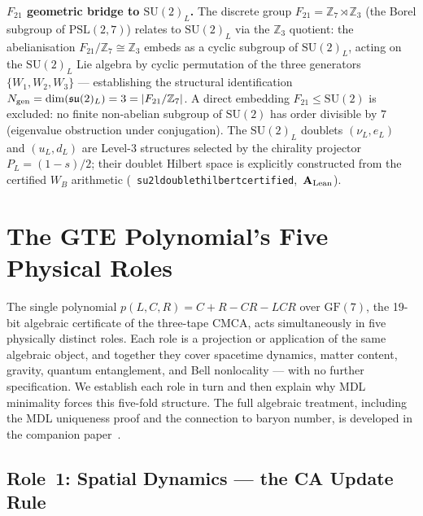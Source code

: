 \documentclass[11pt]{article}
\theoremstyle{remark}
\newcommand{\lean}[1]{%
  \penalty-100
  \begingroup\def\_{\textunderscore\allowbreak}\texttt{#1}\endgroup}
\newcommand{\CatAL}{\ensuremath{\textbf{A}_{\rm Lean}}}
\newcommand{\CMCA}{\text{CMCA}}
\newcommand{\poly}{p(L,C,R)}
\newcommand{\polyform}{C+R-CR-LCR}
\newcommand{\FF}{\mathrm{GF}}
\begin{document}
\smallskip\noindent\textbf{$F_{21}$ geometric bridge to $\mathrm{SU}(2)_L$.}\enspace
The discrete group $F_{21} = \mathbb{Z}_7 \rtimes \mathbb{Z}_3$ (the Borel subgroup of
$\mathrm{PSL}(2,7)$) relates to $\mathrm{SU}(2)_L$ via the $\mathbb{Z}_3$ quotient:
the abelianisation $F_{21}/\mathbb{Z}_7 \cong \mathbb{Z}_3$ embeds as a cyclic
subgroup of $\mathrm{SU}(2)_L$, acting on the $\mathrm{SU}(2)_L$ Lie algebra by
cyclic permutation of the three generators $\{W_1, W_2, W_3\}$ — establishing the
structural identification $N_{\rm gen} = \dim(\mathfrak{su}(2)_L) = 3 = |F_{21}/\mathbb{Z}_7|$.
A direct embedding $F_{21} \leq \mathrm{SU}(2)$ is excluded: no finite non-abelian
subgroup of $\mathrm{SU}(2)$ has order divisible by $7$ (eigenvalue obstruction under
conjugation).  The $\mathrm{SU}(2)_L$ doublets $(\nu_L, e_L)$ and $(u_L, d_L)$ are
Level-3 structures selected by the chirality projector $P_L = (1-s)/2$; their
doublet Hilbert space is explicitly constructed from the certified $W_B$ arithmetic
\mbox{(\lean{su2l\_doublet\_hilbert\_certified}, \CatAL)}.

\FloatBarrier

\section{The GTE Polynomial's Five Physical Roles}
\label{sec:five-roles}

The single polynomial $\poly = \polyform$ over $\FF(7)$, the
19-bit algebraic certificate of the three-tape $\CMCA$, acts
simultaneously in five physically distinct roles.  Each role is a
projection or application of the same algebraic object, and together
they cover spacetime dynamics, matter content, gravity, quantum
entanglement, and Bell nonlocality — with no further specification.
We establish each role in turn and then explain why MDL minimality
forces this five-fold structure.  The full algebraic treatment,
including the MDL uniqueness proof and the connection to baryon number,
is developed in the companion paper~\cite{SpivackGTEPolynomialUFT}.

\subsection{Role~1: Spatial Dynamics --- the CA Update Rule}
\label{sec:role-spatial}
\end{document}
